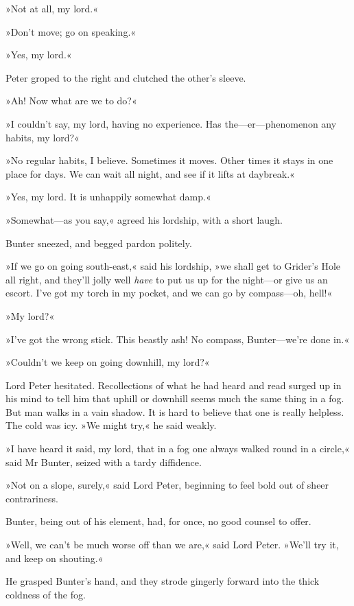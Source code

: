 »Not at all, my lord.«

»Don't move; go on speaking.«

»Yes, my lord.«

Peter groped to the right and clutched the other's sleeve.

»Ah! Now what are we to do?«

»I couldn't say, my lord, having no experience. Has the—er—\newline phenomenon any habits, my lord?«

»No regular habits, I believe. Sometimes it moves. Other times it stays in one place for days. We can wait all night, and see if it lifts at daybreak.«

»Yes, my lord. It is unhappily somewhat damp.«

»Somewhat—as you say,« agreed his lordship, with a short laugh.

Bunter sneezed, and begged pardon politely.

»If we go on going south-east,« said his lordship, »we shall get to Grider's Hole all right, and they'll jolly well \textit{have} to put us up for the night—or give us an escort. I've got my torch in my pocket, and we can go by compass—oh, hell!«

»My lord?«

»I've got the wrong stick. This beastly ash! No compass, Bunter—we're done in.«

»Couldn't we keep on going downhill, my lord?«

Lord Peter hesitated. Recollections of what he had heard and read surged up in his mind to tell him that uphill or downhill seems much the same thing in a fog. But man walks in a vain shadow. It is hard to believe that one is really helpless. The cold was icy. »We might try,« he said weakly.

»I have heard it said, my lord, that in a fog one always walked round in a circle,« said Mr Bunter, seized with a tardy diffidence.

»Not on a slope, surely,« said Lord Peter, beginning to feel bold out of sheer contrariness.

Bunter, being out of his element, had, for once, no good counsel to offer.

»Well, we can't be much worse off than we are,« said Lord Peter. »We'll try it, and keep on shouting.«

He grasped Bunter's hand, and they strode gingerly forward into the thick coldness of the fog.

